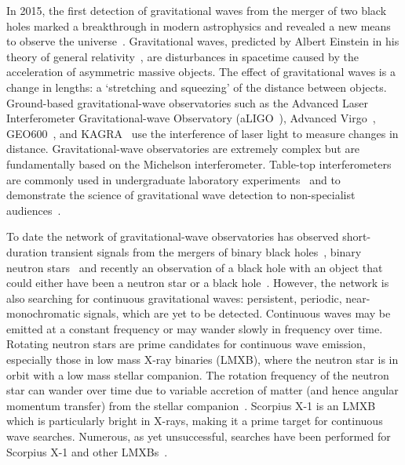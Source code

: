 \documentclass[paper-main.tex]{subfiles}
\begin{document}
In 2015, the first detection of gravitational waves from the merger of two black holes marked a breakthrough in modern astrophysics and revealed a new means to observe the universe~\cite{GW150914}.
Gravitational waves, predicted by Albert Einstein in his theory of general relativity~\cite{Einstein:1916}, are disturbances in spacetime caused by the acceleration of asymmetric massive objects.
The effect of gravitational waves is a change in lengths: a `stretching and squeezing' of the distance between objects. 
Ground-based gravitational-wave observatories such as the Advanced Laser Interferometer Gravitational-wave Observatory (aLIGO~\cite{AdvancedLIGO:2015}), Advanced Virgo~\cite{AdvancedVirgo:2015}, GEO600~\cite{GEO600:2010}, and KAGRA~\cite{KAGRA:2013} use the interference of laser light to measure changes in distance. 
Gravitational-wave observatories are extremely complex but are fundamentally based on the Michelson interferometer. 
Table-top interferometers are commonly used in undergraduate laboratory experiments~\cite{UgoliniEtAl:2019} and to demonstrate the science of gravitational wave detection to non-specialist audiences~\cite{ThorLabsIFO,NikhefIFO,AMIGO:online,TTExhibit:2020,LIGOIFOGlue,LIGOIFOMagnets}.


To date the network of gravitational-wave observatories has observed short-duration transient signals from the mergers of 
binary black holes~\cite{GW150914,GW151226,GW170104,GW170814,GW190521,GWTC-1:2018}, 
binary neutron stars~\cite{GW170817,GW170817multi,GW190425,GWTC-1:2018} and recently an observation of a black hole with an object that could either have been a neutron star or a black hole~\cite{GW190814}. 
However, the network is also searching for continuous gravitational waves: persistent, periodic, near-monochromatic signals, which are yet to be detected. 
Continuous waves may be emitted at a constant frequency or may wander slowly in frequency over time. 
Rotating neutron stars are prime candidates for continuous wave emission, especially those in low mass X-ray binaries (LMXB), where the neutron star is in orbit with a low mass stellar companion.
The rotation frequency of the neutron star can wander over time due to variable accretion of matter (and hence angular momentum transfer) from the stellar companion~\cite{xraybinaries:1997}. 
Scorpius X-1 is an LMXB which is particularly bright in X-rays, making it a prime target for continuous wave searches. %
Numerous, as yet unsuccessful, searches have been performed for Scorpius X-1 and other LMXBs~\cite{ScoX1O2Viterbi:2019, ScoX1ViterbiO1:2017, RadiometerO1O2:2019, SearchRadiometerO1:2017, SearchCrossCorrO1:2017, ScoX1ViterbiO1:2017, SearchTwoSpecS6:2017, MiddletonEtAlO2LMXBs:2020}. 
\end{document}

